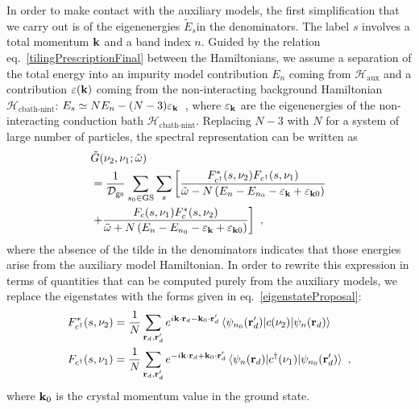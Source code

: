 \documentclass[reprint,hidelinks]{revtex4-2}
\begin{document}
In order to make contact with the auxiliary models, the first simplification  that we carry out is of the eigenenergies \(\tilde E_s\)in the denominators. The label \(s\) involves a total momentum \({\bf k}\) and a band index \(n\). Guided by the relation eq.~\ref{tilingPrescriptionFinal} between the Hamiltonians, we assume a separation of the total energy into an impurity model contribution \(E_n\) coming from \(\mathcal{H}_\text{aux}\) and a contribution \(\varepsilon({\bf k})\) coming from the non-interacting background Hamiltonian \(\mathcal{H}_\text{cbath-nint}\): \(E_s \simeq N E_n - (N-3) \varepsilon_{\bf k}\)~, where \(\varepsilon_{\bf k}\) are the eigenenergies of the non-interacting conduction bath \(\mathcal{H}_\text{cbath-nint}\). Replacing \(N-3\) with \(N\) for a system of large number of particles, the spectral representation can be written as
\begin{equation}\begin{aligned}
	&\tilde G(\nu_2, \nu_1; \tilde\omega) \\
	&= \frac{1}{\mathcal{D}_\text{gs}}\sum_{s_0 \in \text{GS}}\sum_s \left[\frac{F_{c^\dagger}^*(s, \nu_2)F_{c^\dagger}(s, \nu_1)}{\tilde\omega - N\left( E_n - E_{n_0} - \varepsilon_{\bf k} + \varepsilon_{{\bf k}0}\right) } \right.\\
	&\left. + \frac{F_{c}(s, \nu_1)F_{c}^*(s, \nu_2)}{\tilde\omega + N\left( E_n - E_{n_0} - \varepsilon_{\bf k} + \varepsilon_{{\bf k}0}\right) }\right] ~,
\end{aligned}\end{equation}
where the absence of the tilde in the denominators indicates that those energies arise from the auxiliary model Hamiltonian. In order to rewrite this expression in terms of quantities that can be computed purely from the auxiliary models, we replace the eigenstates with the forms given in eq.~\ref{eigenstateProposal}:
\begin{equation}\begin{aligned}\label{spectralWeightsAuxiliary}
	&F_{c^\dagger}^*(s, \nu_2) = \frac{1}{N}\sum_{{\bf r}_d, {\bf r}_d^\prime} e^{i {\bf k}\cdot{\bf r}_d - {\bf k}_0\cdot{\bf r}_d^\prime} \braket{\psi_{n_0}({\bf r}_d^\prime)|c(\nu_2)|\psi_{n}({\bf r}_d)}\\
	&F_{c^\dagger}(s, \nu_1) = \frac{1}{N}\sum_{{\bf r}_d, {\bf r}_d^\prime} e^{-i {\bf k}\cdot{\bf r}_d + {\bf k}_0\cdot{\bf r}_d^\prime} \braket{\psi_n({\bf r}_d)|c^\dagger(\nu_1)|\psi_{n_0}({\bf r}_d^\prime)}~,
\end{aligned}\end{equation}
where \({\bf k}_0\) is the crystal momentum value in the ground state.
\end{document}
